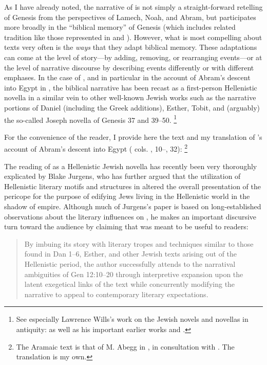 As I have already noted, the narrative of \ga is not simply a straight-forward retelling of Genesis from the perspectives of Lamech, Noah, and Abram, but participates more broadly in the ``biblical memory'' of Genesis (which includes related tradition like those represented in \firstenoch and \jub). However, what is most compelling about \rwb texts very often is the \emph{ways} that they adapt biblical memory. These adaptations can come at the level of story---by adding, removing, or rearranging events---or at the level of narrative discourse by describing events differently or with different emphases. In the case of \ga, and in particular in the account of Abram's descent into Egypt in , the biblical narrative has been recast as a first-person Hellenistic novella in a similar vein to other well-known \secondtemple Jewish works such as the narrative portions of Daniel (including the Greek additions), Esther, Tobit, and (arguably) the so-called Joseph novella of Genesis 37 and 39--50.%
    \footnote{See especially Lawrence Wills's work on the Jewish novels and novellas in antiquity: \cite*{wills2002} as well as his important earlier works \cite*{wills1995} and \cite*{wills1990}.}

For the convenience of the reader, I provide here the text and my translation of \ga's account of Abram's descent into Egypt ( cols. , 10--, 32):%
    \footnote{The Aramaic text is that of M. Abegg in \cite[1:534--537]{perry-tov2014}, in consultation with \cite{fitzmyer2004}. The translation is my own.}





The reading of \ga {} as a Hellenistic Jewish novella has recently been very thoroughly explicated by Blake Jurgens, who has further argued that the utilization of Hellenistic literary motifs and structures in \ga altered the overall presentation of the pericope for the purpose of edifying Jews living in the Hellenistic world in the shadow of empire.%
    \autocite{jurgens_jsj2018}
Although much of Jurgens's paper is based on long-established observations about the literary influences on \ga, he makes an important discursive turn toward the audience by claiming that \ga was meant to be useful to readers:

\begin{quote}
    By imbuing its story with literary tropes and techniques similar to those found in Dan 1--6, Esther, and other Jewish texts arising out of the Hellenistic period, the author successfully attends to the narratival ambiguities of Gen 12:10--20 through interpretive expansion upon the latent exegetical links of the text while concurrently modifying the narrative to appeal to contemporary literary expectations.\autocite[27]{jurgens_jsj2018}
\end{quote}

